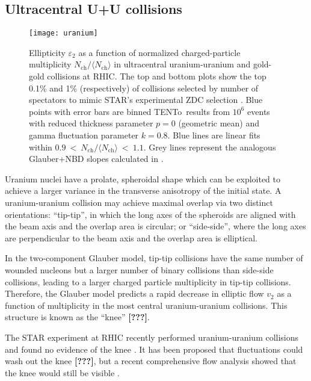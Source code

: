 \documentclass[aps,prl,reprint,amsmath,nofootinbib]{revtex4-1}
\newcommand{\trento}{T\raisebox{-.5ex}{R}ENTo}
\newcommand{\nch}{N_\text{ch}}
\newcommand{\needcite}{\textbf{[???]}}
\begin{document}
\subsection{Ultracentral U+U collisions}

\begin{figure}[b]
  \centering
  \texttt{[image: uranium]}
  \caption{
    \label{fig:uranium}
    Ellipticity $\varepsilon_2$ as a function of normalized charged-particle multiplicity
    $\nch/\langle\nch\rangle$ in ultracentral uranium-uranium and gold-gold collisions at RHIC.  The top and
    bottom plots show the top 0.1\% and 1\% (respectively) of collisions selected by number of spectators to
    mimic STAR's experimental ZDC selection \cite{FortheSTAR:2013bza}.  Blue points with error bars are binned
    \protect\trento\ results from $10^6$ events with reduced thickness parameter $p = 0$ (geometric mean) and
    gamma fluctuation parameter $k = 0.8$.  Blue lines are linear fits within
    $0.9~<~\nch/\langle\nch\rangle~<~1.1$.  Grey lines represent the analogous Glauber+NBD slopes calculated
    in \cite{FortheSTAR:2013bza}.
  }
\end{figure}

Uranium nuclei have a prolate, spheroidal shape which can be exploited to achieve a larger variance in the transverse anisotropy 
of the initial state. A uranium-uranium collision may achieve maximal overlap via two distinct orientations: 
``tip-tip'', in which the long axes of the spheroids are aligned with the beam axis and the overlap area is circular; or ``side-side'', 
where the long axes are perpendicular to the beam axis and the overlap area is elliptical. %

In the two-component Glauber model, tip-tip collisions have the same number of wounded nucleons but a larger number of binary
collisions than side-side collisions, leading to a larger charged particle multiplicity in tip-tip collisions. Therefore, the Glauber model predicts a
rapid decrease in elliptic flow $v_2$ as a function of multiplicity in the most central uranium-uranium
collisions.  This structure is known as the ``knee'' \needcite.

The STAR experiment at RHIC recently performed uranium-uranium collisions and found no evidence of the knee
\cite{FortheSTAR:2013bza}.  It has been proposed that fluctuations could wash out the knee \needcite, but a recent
comprehensive flow analysis showed that the knee would still be visible \cite{osu}.
\end{document}
